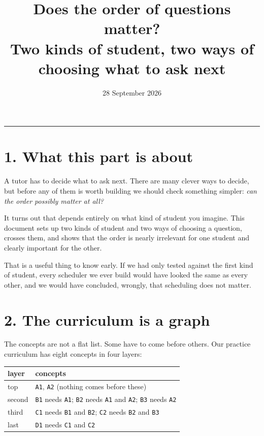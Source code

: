 \documentclass[11pt]{article}
\title{\vspace{-1.2cm}\textbf{Does the order of questions matter?}\\[3pt]
\large Two kinds of student, two ways of choosing what to ask next}
\author{}
\date{\small 28 September 2026}
\newcommand{\code}[1]{\texttt{\small #1}}
\begin{document}
\maketitle
\vspace{-1.0cm}
\noindent\rule{\textwidth}{0.4pt}

\section*{1. What this part is about}

A tutor has to decide what to ask next. There are many clever ways to
decide, but before any of them is worth building we should check something
simpler: \emph{can the order possibly matter at all?}

It turns out that depends entirely on what kind of student you imagine.
This document sets up two kinds of student and two ways of choosing a
question, crosses them, and shows that the order is nearly irrelevant for
one student and clearly important for the other.

That is a useful thing to know early. If we had only tested against the
first kind of student, every scheduler we ever build would have looked the
same as every other, and we would have concluded, wrongly, that
scheduling does not matter.

\section*{2. The curriculum is a graph}

The concepts are not a flat list. Some have to come before others. Our
practice curriculum has eight concepts in four layers:

\begin{center}
\small
\begin{tabular}{@{}ll@{}}
\toprule
\textbf{layer} & \textbf{concepts}\\
\midrule
top & \code{A1}, \code{A2} \quad (nothing comes before these)\\
second & \code{B1} needs \code{A1}; \quad \code{B2} needs \code{A1} and
\code{A2}; \quad \code{B3} needs \code{A2}\\
third & \code{C1} needs \code{B1} and \code{B2}; \quad \code{C2} needs
\code{B2} and \code{B3}\\
last & \code{D1} needs \code{C1} and \code{C2}\\
\bottomrule
\end{tabular}
\end{center}
\end{document}
